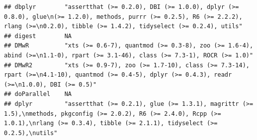 \documentclass[]{article}
\begin{document}
\begin{verbatim}
## dbplyr        "assertthat (>= 0.2.0), DBI (>= 1.0.0), dplyr (>= 0.8.0), glue\n(>= 1.2.0), methods, purrr (>= 0.2.5), R6 (>= 2.2.2), rlang (>=\n0.2.0), tibble (>= 1.4.2), tidyselect (>= 0.2.4), utils"                                                                                                                                                                                                                                                                                             
## digest        NA                                                                                                                                                                                                                                                                                                                                                                                                                                                                                    
## DMwR          "xts (>= 0.6-7), quantmod (>= 0.3-8), zoo (>= 1.6-4), abind (>=\n1.1-0), rpart (>= 3.1-46), class (>= 7.3-1), ROCR (>= 1.0)"                                                                                                                                                                                                                                                                                                                                                          
## DMwR2         "xts (>= 0.9-7), zoo (>= 1.7-10), class (>= 7.3-14), rpart (>=\n4.1-10), quantmod (>= 0.4-5), dplyr (>= 0.4.3), readr (>=\n1.0.0), DBI (>= 0.5)"                                                                                                                                                                                                                                                                                                                                      
## doParallel    NA                                                                                                                                                                                                                                                                                                                                                                                                                                                                                    
## dplyr         "assertthat (>= 0.2.1), glue (>= 1.3.1), magrittr (>= 1.5),\nmethods, pkgconfig (>= 2.0.2), R6 (>= 2.4.0), Rcpp (>= 1.0.1),\nrlang (>= 0.3.4), tibble (>= 2.1.1), tidyselect (>= 0.2.5),\nutils"                                                                                                                                                                                                                                                                                      

\end{verbatim}
\end{document}
